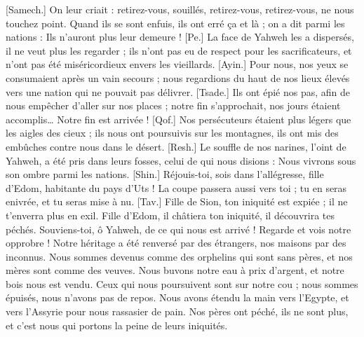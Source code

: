 \begin{multicols}{2}
[Samech.] On leur criait : retirez-vous, souillés, retirez-vous, retirez-vous, ne nous touchez point. Quand ils se sont enfuis, ils ont erré ça et là ; on a dit parmi les nations : Ils n'auront plus leur demeure !
[Pe.] La face de Yahweh les a dispersés, il ne veut plus les regarder ; ils n'ont pas eu de respect pour les sacrificateurs, et n'ont pas été miséricordieux envers les vieillards.
[Ayin.] Pour nous, nos yeux se consumaient après un vain secours ; nous regardions du haut de nos lieux élevés vers une nation qui ne pouvait pas délivrer.
[Tsade.] Ils ont épié nos pas, afin de nous empêcher d'aller sur nos places ; notre fin s'approchait, nos jours étaient accomplis… Notre fin est arrivée !
[Qof.] Nos persécuteurs étaient plus légers que les aigles des cieux ; ils nous ont poursuivis sur les montagnes, ils ont mis des embûches contre nous dans le désert.
[Resh.] Le souffle de nos narines, l'oint de Yahweh, a été pris dans leurs fosses, celui de qui nous disions : Nous vivrons sous son ombre parmi les nations.
[Shin.] Réjouis-toi, sois dans l'allégresse, fille d'Edom, habitante du pays d'Uts ! La coupe passera aussi vers toi ; tu en seras enivrée, et tu seras mise à nu.
[Tav.] Fille de Sion, ton iniquité est expiée ; il ne t'enverra plus en exil. Fille d'Edom, il châtiera ton iniquité, il découvrira tes péchés.
\VerseOne{}Souviens-toi, ô Yahweh, de ce qui nous est arrivé ! Regarde et vois notre opprobre !
Notre héritage a été renversé par des étrangers, nos maisons par des inconnus.
Nous sommes devenus comme des orphelins qui sont sans pères, et nos mères sont comme des veuves.
Nous buvons notre eau à prix d'argent, et notre bois nous est vendu.
Ceux qui nous poursuivent sont sur notre cou ; nous sommes épuisés, nous n'avons pas de repos.
Nous avons étendu la main vers l'Egypte, et vers l'Assyrie pour nous rassasier de pain.
Nos pères ont péché, ils ne sont plus, et c'est nous qui portons la peine de leurs iniquités.

\end{multicols}
